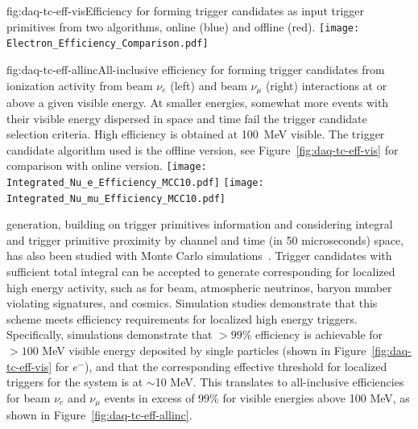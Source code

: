 \begin{dunefigure}{fig:daq-tc-eff-vis}{Efficiency for forming trigger candidates as input trigger primitives from two algorithms, online (blue) and offline (red).}
  \texttt{[image: Electron\_Efficiency\_Comparison.pdf]}
\end{dunefigure}

\begin{dunefigure}{fig:daq-tc-eff-allinc}{All-inclusive efficiency for
    forming trigger candidates from ionization activity from beam $\nu_e$
    (left) and beam $\nu_\mu$ (right) interactions at or above a given
    visible energy. 
    At smaller energies, somewhat more events with their visible energy
    dispersed in space and time fail the trigger candidate selection
    criteria. 
    High efficiency is obtained at \SI{100}{\MeV} visible. 
    The trigger candidate algorithm used is the offline version, see
    Figure~\ref{fig:daq-tc-eff-vis} for comparison with online version.}
  \texttt{[image: Integrated\_Nu\_e\_Efficiency\_MCC10.pdf]}%
  \texttt{[image: Integrated\_Nu\_mu\_Efficiency\_MCC10.pdf]}
\end{dunefigure}


 generation, building on trigger primitives information
and considering integral  and trigger primitive proximity by channel
and time (in 50 microseconds) space, has also been studied with Monte
Carlo simulations~\cite{bib:docdb11215}.
Trigger candidates with sufficient total integral   can be accepted to
generate corresponding  for localized high energy
activity, such as for beam, atmospheric neutrinos, baryon number
violating signatures, and cosmics.
Simulation studies demonstrate that this scheme meets efficiency
requirements for localized high energy triggers.
Specifically, simulations demonstrate that $>99$\% efficiency is
achievable for $>100$ MeV visible energy deposited by single particles
(shown in Figure~\ref{fig:daq-tc-eff-vis} for $e^-$), and that the
corresponding effective threshold for localized triggers for the system
is at $\sim$10 MeV. This translates to all-inclusive efficiencies for
beam $\nu_e$ and $\nu_\mu$ events in excess of 99\% for visible energies
above 100 MeV, as shown in Figure~\ref{fig:daq-tc-eff-allinc}.

